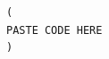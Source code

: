 \documentclass{article}
\begin{document}
\pagestyle{empty}

\begin{verbatim}
(
PASTE CODE HERE
)
\end{verbatim}
\end{document}
